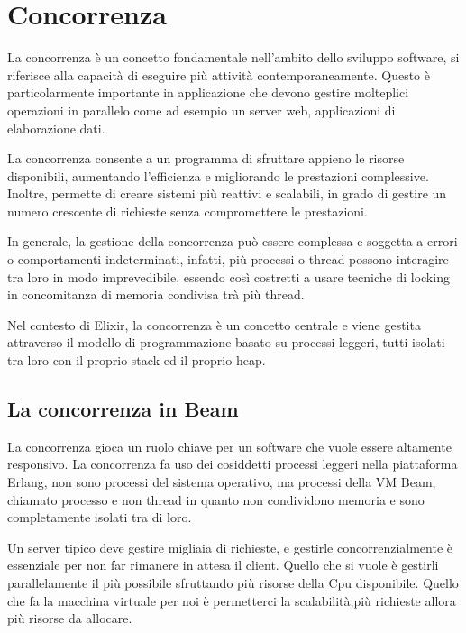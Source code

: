 \section{Concorrenza}

La concorrenza è un concetto fondamentale nell'ambito
dello sviluppo software, si riferisce alla capacità
di eseguire più attività contemporaneamente.
Questo è particolarmente importante in applicazione
che devono gestire molteplici operazioni in parallelo
come ad esempio un server web, applicazioni di
elaborazione dati.

La concorrenza consente a un programma di sfruttare appieno
le risorse disponibili, aumentando l'efficienza e migliorando
le prestazioni complessive.
Inoltre, permette di creare sistemi più reattivi e
scalabili, in grado di gestire un numero crescente di
richieste senza compromettere le prestazioni.

In generale, la gestione della concorrenza può essere complessa
e soggetta a errori o comportamenti indeterminati, infatti,
più processi o thread possono interagire tra loro in modo
imprevedibile, essendo così costretti a usare tecniche di
locking in concomitanza di memoria condivisa trà più thread.

Nel contesto di Elixir, la concorrenza è un concetto centrale
e viene gestita attraverso il modello di programmazione
basato su processi leggeri, tutti isolati tra loro con il proprio
stack ed il proprio heap.


\subsection{La concorrenza in Beam}

La concorrenza gioca un ruolo chiave per un software
che vuole essere altamente responsivo.
La concorrenza fa uso dei cosiddetti processi leggeri
nella piattaforma Erlang, non sono processi del 
sistema operativo, ma processi della
VM Beam, chiamato processo e non thread in quanto non
condividono memoria e sono completamente
isolati tra di loro.

Un server tipico deve gestire migliaia di richieste, e
gestirle concorrenzialmente è essenziale per non far
rimanere in attesa il client. Quello che si vuole è
gestirli parallelamente il più possibile sfruttando
più risorse della Cpu disponibile.
Quello che fa la macchina virtuale per noi è permetterci
la scalabilità,più richieste allora più risorse da allocare.

